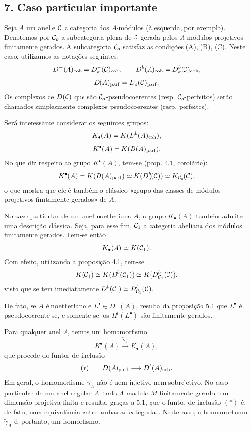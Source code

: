\subsection*{7. Caso particular importante}

Seja $A$ um anel e $\mathcal C$ a categoria dos $A$-módulos (à esquerda, por exemplo). Denotemos por $\mathcal C_o$ a subcategoria plena de $\mathcal C$ gerada pelos $A$-módulos projetivos finitamente gerados. A subcategoria $\mathcal C_o$ satisfaz as condições (A), (B), (C). Neste caso, utilizamos as notações seguintes:
\[
D^-(A)_{\mathrm{coh}}=D_o^-(\mathcal C)_{\mathrm{coh}},\qquad
D^b(A)_{\mathrm{coh}}=D_o^b(\mathcal C)_{\mathrm{coh}},
\]
\[
D(A)_{\mathrm{parf}}=D_o(\mathcal C)_{\mathrm{parf}}.
\]
Os complexos de $D(\mathcal C)$ que são $\mathcal C_o$-pseudocoerentes (resp. $\mathcal C_o$-perfeitos) serão chamados simplesmente complexos pseudocoerentes (resp. perfeitos).

Será interessante considerar os seguintes grupos:
\[
K_\bullet(A)=K(D^b(A)_{\mathrm{coh}}),
\]
\[
K^\bullet(A)=K(D(A)_{\mathrm{parf}}).
\]
No que diz respeito ao grupo $K^\bullet(A)$, tem-se (prop. 4.1, corolário):
\[
K^\bullet(A)=K(D(A)_{\mathrm{parf}})\simeq K(D_o^b(\mathcal C))\simeq K_{\mathcal C_o}(\mathcal C),
\]
o que mostra que ele é também o clássico «grupo das classes de módulos projetivos finitamente gerados» de $A$.

No caso particular de um anel noetheriano $A$, o grupo $K_\bullet(A)$ também admite uma descrição clássica. Seja, para esse fim, $\mathcal C_1$ a categoria abeliana dos módulos finitamente gerados. Tem-se então
\[
K_\bullet(A)\simeq K(\mathcal C_1).
\]
Com efeito, utilizando a proposição 4.1, tem-se
\[
K(\mathcal C_1)\simeq K(D^b(\mathcal C_1))\simeq K(D^b_{\mathcal C_1}(\mathcal C)),
\]
visto que se tem imediatamente $D^b(\mathcal C_1)\simeq D^b_{\mathcal C_1}(\mathcal C)$.

De fato, se $A$ é noetheriano e $L^\bullet\in D^-(A)$, resulta da proposição 5.1 que $L^\bullet$ é pseudocoerente se, e somente se, os $H^i(L^\bullet)$ são finitamente gerados.

Para qualquer anel $A$, temos um homomorfismo
\[
K^{\bullet}(A)\xrightarrow{\widetilde\gamma_A}K_\bullet(A),
\]
que procede do funtor de inclusão
\[
(*)\qquad D(A)_{\mathrm{parf}}\longrightarrow D^b(A)_{\mathrm{coh}}.
\]
Em geral, o homomorfismo $\widetilde\gamma_A$ não é nem injetivo nem sobrejetivo. No caso particular de um anel regular $A$, todo $A$-módulo $M$ finitamente gerado tem dimensão projetiva finita e resulta, graças a 5.1, que o funtor de inclusão $(*)$ é, de fato, uma equivalência entre ambas as categorias. Neste caso, o homomorfismo $\widetilde\gamma_A$ é, portanto, um isomorfismo.
